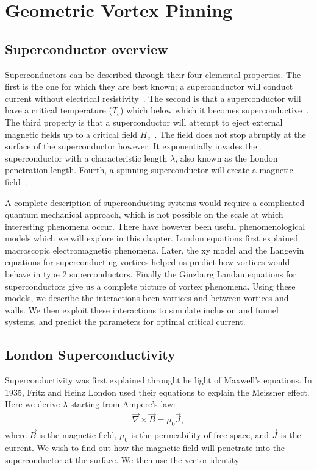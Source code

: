 \chapter{Geometric Vortex Pinning}
\label{theoryvortex}

\section{Superconductor overview}
Superconductors can be described through their four elemental properties. The first is the one for which they are best known; a superconductor will conduct current without electrical resistivity~\cite{Gallop90}. The second is that a superconductor will have a critical temperature ($T_c$) which below which it becomes superconductive~\cite{Hove09}. The third property is that a superconductor will attempt to eject external magnetic fields up to a critical field $H_c$~\cite{Landau84}. The field does not stop abruptly at the surface of the superconductor however. It exponentially invades the superconductor with a characteristic length $\lambda$, also known as the London penetration length. Fourth, a spinning superconductor will create a magnetic field~\cite{Nasa}. 

	A complete description of superconducting systems would require a complicated quantum mechanical approach, which is not possible on the scale at which interesting phenomena occur. There have however been useful phenomenological models which we will explore in this chapter. London equations first explained macroscopic electromagnetic phenomena. Later, the xy model and the Langevin equations for superconducting vortices helped us predict how vortices would behave in type 2 superconductors. Finally the Ginzburg Landau equations for superconductors give us a complete picture of vortex phenomena. Using these models, we describe the interactions been vortices and between vortices and walls. We then exploit these interactions to simulate inclusion and funnel systems, and predict the parameters for optimal critical current. 
\section{London Superconductivity}
Superconductivity was first explained throught he light of Maxwell's equations. In 1935, Fritz and Heinz London used their equations to explain the Meissner effect. Here we derive $\lambda$ starting from Ampere's law:
\begin{eqnarray}
\overrightarrow \nabla \times \overrightarrow B  = \mu_0 \overrightarrow J,
\label{Ampere}
\end{eqnarray}
where $\overrightarrow B$ is the magnetic field, $\mu_0$ is the permeability of free space, and $\overrightarrow J$ is the current. We wish to find out how the magnetic field will penetrate into the superconductor at the surface. We then use the vector identity


